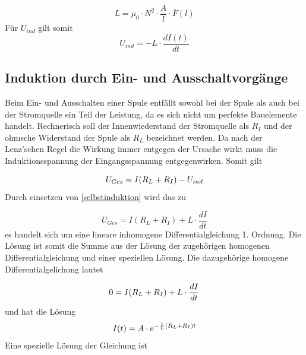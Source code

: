 \documentclass{article}
\begin{document}
\begin{equation}
L = \mu_0 \cdot N^2 \cdot \frac{A}{l} \cdot  \bar{F}(l)
\label{selbstinduktionkoeff}
\end{equation}
\noindent
Für \(U_{ind}\) gilt somit
\begin{equation}
U_{ind} = -L \cdot \frac{dI(t)}{dt}
\label{selbstinduktion}
\end{equation}

\newpage

\subsection{Induktion durch Ein- und Ausschaltvorgänge}
Beim Ein- und Ausschalten einer Spule entfällt sowohl bei der Spule als auch bei der Stromquelle ein Teil der Leistung, da es sich nicht um perfekte Bauelemente handelt. Rechnerisch soll der Innenwiederstand der Stromquelle als \(R_I\) und der ohmsche Widerstand der Spule als \(R_L\) bezeichnet werden. Da nach der {\sc Lenz'schen Regel} die Wirkung immer entgegen der Ursache wirkt  muss die Induktionsspannung der Eingangsspannung entgegenwirken. Somit gilt

\begin{equation}
U_{Ges} = I(R_L+R_I) - U_{ind}
\notag
\end{equation}
\noindent
Durch einsetzen von \eqref{selbstinduktion} wird das zu

\begin{equation}
U_{Ges} = I(R_L+R_I) + L \cdot \frac{dI}{dt}
\label{einaus_dgl}
\end{equation}
\noindent
es handelt sich um eine lineare inhomogene Differentialgleichung 1. Ordnung.
Die Lösung ist somit die Summe aus der Lösung der zugehörigen homogenen Differentialgleichung und einer speziellen Lösung. Die dazugehörige homogene Differentialgelichung lautet

\begin{equation}
0 = I(R_L+R_I) + L \cdot \frac{dI}{dt}
\notag
\end{equation}
\noindent
und hat die Lösung
\begin{equation}
I(t) = A \cdot e^{-\frac{1}{L}(R_L+R_I)t}
\notag
\end{equation}
\noindent
Eine spezielle Lösung der Gleichung ist
\end{document}
